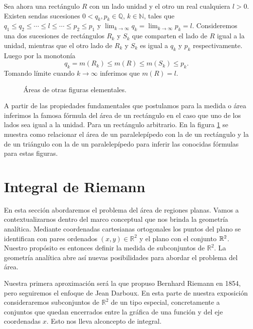 Sea ahora una rectángulo $R$ con un lado unidad y el otro un real cualquiera $l>0$. Existen sendas sucesiones $0<q_k,p_k\in\mathbb{Q}$, $k\in\mathbb{N}$, tales que $q_1\leq q_2\leq\cdots \leq l \leq \cdots\leq p_2\leq p_1$ y $\lim_{k\to\infty}q_k =\lim_{k\to\infty} p_k=l$. Consideremos una dos sucesiones de rectángulos $R_k$ y $S_k$ que comparten el lado de $R$ igual a la unidad, mientras que el otro lado de $R_k$ y $S_k$ es igual a $q_k$ y $p_k$ respectivamente. Luego por la monotonía
\[
 q_k=m(R_k)\leq m(R) \leq m(S_k)\leq p_k.
\]
Tomando límite cuando $k\to\infty$ inferimos que $m(R)=l$. 



\begin{figure}[h]
 \begin{center}
  
 \end{center}
 \caption{Áreas de otras figuras elementales.}\label{fig:paral-trig}
\end{figure}


A partir de las propiedades fundamentales que postulamos para la medida o área inferimos la famosa fórmula del área de un rectángulo en el caso que uno de los lados sea igual a la unidad. Para un  rectángulo arbitrario. En la figura \ref{fig:paral-trig} se muestra como relacionar el área de un paralelepípedo con la de un rectángulo y la de un triángulo con la de un paralelepípedo para inferir las conocidas fórmulas para estas figuras.



\section{Integral de Riemann}

En esta sección abordaremos el problema del área de regiones planas. Vamos a contextualizarnos dentro del marco conceptual que nos brinda la geometría analítica. Mediante coordenadas cartesianas ortogonales los puntos del plano se identifican con pares ordenados $(x,y)\in\mathbb{R}^2$ y el plano con el conjunto $\mathbb{R}^2$.  Nuestro propósito es entonces definir la medida de subconjuntos de $\mathbb{R}^2$. La geometría analítica abre así nuevas posibilidades para abordar el problema del área. 

Nuestra primera aproximación será la que propuso Bernhard Riemann en 1854, pero seguiremos  el enfoque de Jean Darboux. En esta parte de nuestra exposición consideraremos subconjuntos de $\mathbb{R}^2$ de un tipo especial, concretamente a conjuntos que quedan encerrados entre la gráfica de una función y del eje coordenadas $x$. Esto nos lleva alconcepto de integral. 


